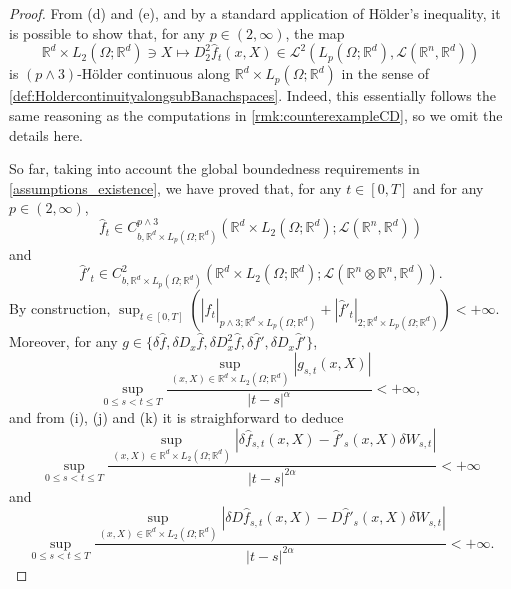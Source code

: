 \documentclass[10pt, a4paper]{article} %
\newcommand{\R}{\mathbb{R}}
\theoremstyle{definition}
\theoremstyle{plain}
\begin{document}
\begin{proof}
    From (d) and (e), and by a standard application of H\"older's inequality, it is possible to show that, for any $p \in (2,\infty)$, the map \begin{equation*}
        \R^d \times L_2(\Omega;\R^d) \ni X \mapsto D^2_2 \hat{f}_t(x,X) \in \mathscr{L}^2(L_p(\Omega;\R^d), \mathscr{L}(\R^n,\R^d))
    \end{equation*}
    is $(p \wedge 3)$-H\"older continuous along $\R^d \times L_p(\Omega;\R^d)$ in the sense of \cref{def:HoldercontinuityalongsubBanachspaces}.
    Indeed, this essentially follows the same reasoning as the computations in \cref{rmk:counterexampleCD}, so we omit the details here. %

    So far, taking into account the global boundedness requirements in \cref{assumptions_existence}, we have proved that, for any $t \in [0,T]$ and for any $p \in (2,\infty)$, \begin{equation*}
        \hat{f}_t \in C^{p\wedge 3}_{b,\R^d \times L_p(\Omega;\R^d)}(\R^d \times L_2(\Omega;\R^d);\mathscr{L}(\R^n,\R^d)) 
    \end{equation*} and \begin{equation*}
        \hat{f}'_t \in C^2_{b,\R^d \times L_p(\Omega;\R^d)}(\R^d \times L_2(\Omega;\R^d);\mathscr{L}(\R^n \otimes \R^n,\R^d)). 
    \end{equation*}
    By construction, $\sup_{t \in [0,T]} (|\hat{f}_t|_{p \wedge 3;\R^d \times L_p(\Omega;\R^d)} + |\hat{f}'_t|_{2;\R^d \times L_p(\Omega;\R^d)}) < +\infty$. 
    Moreover, for any $g \in \{\delta \hat{f}, \delta D_x\hat{f}, \delta D^2_x\hat{f},\delta \hat{f}',\delta D_x \hat{f}'\}$, \begin{equation*}
        \sup_{0 \le s < t \le T} \frac{\sup_{(x,X) \in \R^d \times L_2(\Omega;\R^d)} |g_{s,t}(x,X)|}{|t-s|^\alpha} < +\infty ,
    \end{equation*}
    and from (i), (j) and (k) it is straighforward to deduce \begin{equation*}
        \sup_{0 \le s < t \le T} \frac{\sup_{(x,X) \in \R^d \times L_2(\Omega;\R^d)} |\delta\hat{f}_{s,t}(x,X) - \hat{f}'_s(x,X) \delta W_{s,t}|}{|t-s|^{2\alpha}} < +\infty 
    \end{equation*} and \begin{equation*}
        \sup_{0 \le s < t \le T} \frac{\sup_{(x,X) \in \R^d \times L_2(\Omega;\R^d)} |\delta D\hat{f}_{s,t}(x,X) - D\hat{f}'_s(x,X) \delta W_{s,t}|}{|t-s|^{2\alpha}} < +\infty .
    \end{equation*}
\end{proof}
\end{document}
